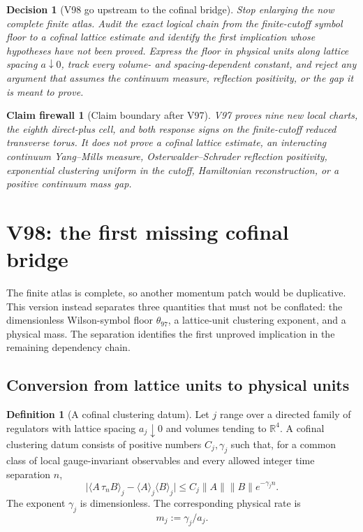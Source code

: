 \documentclass[11pt,oneside]{article}
\newtheorem{firewall}[theorem]{Claim firewall}
\newtheorem{decision}[theorem]{Decision}
\theoremstyle{definition}
\newtheorem{definition}[theorem]{Definition}
\theoremstyle{remark}
\begin{document}
\begin{decision}[V98 go upstream to the cofinal bridge]
\label{dec:newv97-next}
Stop enlarging the now complete finite atlas.  Audit the exact
logical chain from the finite-cutoff symbol floor to a cofinal
lattice estimate and identify the first implication whose
hypotheses have not been proved.  Express the floor in physical
units along lattice spacing \(a\downarrow0\), track every
volume- and spacing-dependent constant, and reject any argument
that assumes the continuum measure, reflection positivity, or the
gap it is meant to prove.
\end{decision}

\begin{firewall}[Claim boundary after V97]
\label{fire:newv97-final}
V97 proves nine new local charts, the eighth direct-plus cell, and
both response signs on the finite-cutoff reduced transverse torus.
It does not prove a cofinal lattice estimate, an interacting
continuum Yang--Mills measure, Osterwalder--Schrader reflection
positivity, exponential clustering uniform in the cutoff,
Hamiltonian reconstruction, or a positive continuum mass gap.
\end{firewall}

\section*{V98: the first missing cofinal bridge}
\label{sec:newv98-cofinal-bridge}

The finite atlas is complete, so another momentum patch would be
duplicative.  This version instead separates three quantities that
must not be conflated: the dimensionless Wilson-symbol floor
\(\theta_{97}\), a lattice-unit clustering exponent, and a physical
mass.  The separation identifies the first unproved implication in
the remaining dependency chain.

\subsection{Conversion from lattice units to physical units}

\begin{definition}[A cofinal clustering datum]
\label{def:newv98-cofinal-datum}
Let \(j\) range over a directed family of regulators with lattice
spacing \(a_j\downarrow0\) and volumes tending to \(\mathbb R^4\).
A cofinal clustering datum consists of positive numbers
\(C_j,\gamma_j\) such that, for a common class of local
gauge-invariant observables and every allowed integer time
separation \(n\),
\[
 \bigl|\langle A\,\tau_nB\rangle_j
       -\langle A\rangle_j\langle B\rangle_j\bigr|
 \leq C_j\|A\|\|B\|e^{-\gamma_j n}.                \tag{98.1}
\]
The exponent \(\gamma_j\) is dimensionless.  The corresponding
physical rate is
\[
 m_j:=\gamma_j/a_j.                                 \tag{98.2}
\]
\end{definition}
\end{document}
